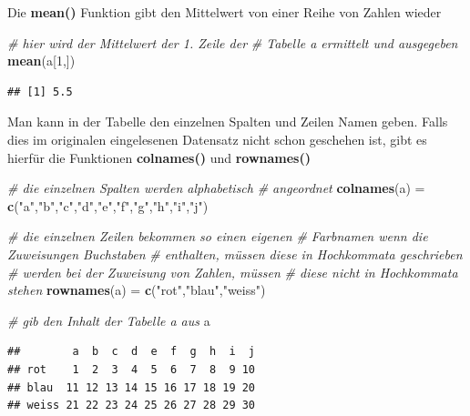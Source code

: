 \documentclass[]{book}
\newenvironment{Shaded}{\begin{snugshade}}{\end{snugshade}}
\newcommand{\KeywordTok}[1]{\textcolor[rgb]{0.13,0.29,0.53}{\textbf{#1}}}
\newcommand{\DecValTok}[1]{\textcolor[rgb]{0.00,0.00,0.81}{#1}}
\newcommand{\StringTok}[1]{\textcolor[rgb]{0.31,0.60,0.02}{#1}}
\newcommand{\CommentTok}[1]{\textcolor[rgb]{0.56,0.35,0.01}{\textit{#1}}}
\newcommand{\NormalTok}[1]{#1}
\begin{document}
Die \textbf{mean()} Funktion gibt den Mittelwert von einer Reihe von
Zahlen wieder

\begin{Shaded}
\begin{Highlighting}[]
\CommentTok{# hier wird der Mittelwert der 1. Zeile der }
\CommentTok{# Tabelle a ermittelt und ausgegeben}
\KeywordTok{mean}\NormalTok{(a[}\DecValTok{1}\NormalTok{,])}
\end{Highlighting}
\end{Shaded}

\begin{verbatim}
## [1] 5.5
\end{verbatim}

Man kann in der Tabelle den einzelnen Spalten und Zeilen Namen geben.
Falls dies im originalen eingelesenen Datensatz nicht schon geschehen
ist, gibt es hierfür die Funktionen \textbf{colnames()} und
\textbf{rownames()}

\begin{Shaded}
\begin{Highlighting}[]
\CommentTok{# die einzelnen Spalten werden alphabetisch}
\CommentTok{# angeordnet}
\KeywordTok{colnames}\NormalTok{(a) =}\StringTok{ }\KeywordTok{c}\NormalTok{(}\StringTok{"a"}\NormalTok{,}\StringTok{"b"}\NormalTok{,}\StringTok{"c"}\NormalTok{,}\StringTok{"d"}\NormalTok{,}\StringTok{"e"}\NormalTok{,}\StringTok{"f"}\NormalTok{,}\StringTok{"g"}\NormalTok{,}\StringTok{"h"}\NormalTok{,}\StringTok{"i"}\NormalTok{,}\StringTok{"j"}\NormalTok{)}

\CommentTok{# die einzelnen Zeilen bekommen so einen eigenen}
\CommentTok{# Farbnamen wenn die Zuweisungen Buchstaben }
\CommentTok{# enthalten, müssen diese in Hochkommata geschrieben }
\CommentTok{# werden bei der Zuweisung von Zahlen, müssen }
\CommentTok{# diese nicht in Hochkommata stehen}
\KeywordTok{rownames}\NormalTok{(a) =}\StringTok{ }\KeywordTok{c}\NormalTok{(}\StringTok{"rot"}\NormalTok{,}\StringTok{"blau"}\NormalTok{,}\StringTok{"weiss"}\NormalTok{)}

\CommentTok{# gib den Inhalt der Tabelle a aus}
\NormalTok{a}
\end{Highlighting}
\end{Shaded}

\begin{verbatim}
##        a  b  c  d  e  f  g  h  i  j
## rot    1  2  3  4  5  6  7  8  9 10
## blau  11 12 13 14 15 16 17 18 19 20
## weiss 21 22 23 24 25 26 27 28 29 30
\end{verbatim}
\end{document}
